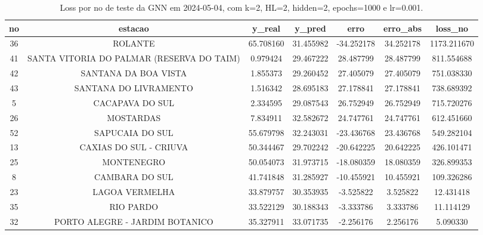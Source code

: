 \begin{table}[h]
\centering
\caption{Loss por no de teste da GNN em 2024-05-04, com k=2, HL=2, hidden=2, epochs=1000 e lr=0.001.}
\label{tab:gnn_loss_k2_hl2_h2_e1000_d20240504}
\begin{tabular}{ccccccc}
\toprule
no & estacao & y\_real & y\_pred & erro & erro\_abs & loss\_no \\
\midrule
36 & ROLANTE & 65.708160 & 31.455982 & -34.252178 & 34.252178 & 1173.211670 \\
41 & SANTA VITORIA DO PALMAR (RESERVA DO TAIM) & 0.979424 & 29.467222 & 28.487799 & 28.487799 & 811.554688 \\
42 & SANTANA DA BOA VISTA & 1.855373 & 29.260452 & 27.405079 & 27.405079 & 751.038330 \\
43 & SANTANA DO LIVRAMENTO & 1.516342 & 28.695183 & 27.178841 & 27.178841 & 738.689392 \\
5 & CACAPAVA DO SUL & 2.334595 & 29.087543 & 26.752949 & 26.752949 & 715.720276 \\
26 & MOSTARDAS & 7.834911 & 32.582672 & 24.747761 & 24.747761 & 612.451660 \\
52 & SAPUCAIA DO SUL & 55.679798 & 32.243031 & -23.436768 & 23.436768 & 549.282104 \\
13 & CAXIAS DO SUL - CRIUVA & 50.344467 & 29.702242 & -20.642225 & 20.642225 & 426.101471 \\
25 & MONTENEGRO & 50.054073 & 31.973715 & -18.080359 & 18.080359 & 326.899353 \\
8 & CAMBARA DO SUL & 41.741848 & 31.285927 & -10.455921 & 10.455921 & 109.326286 \\
23 & LAGOA VERMELHA & 33.879757 & 30.353935 & -3.525822 & 3.525822 & 12.431418 \\
35 & RIO PARDO & 33.522129 & 30.188343 & -3.333786 & 3.333786 & 11.114129 \\
32 & PORTO ALEGRE - JARDIM BOTANICO & 35.327911 & 33.071735 & -2.256176 & 2.256176 & 5.090330 \\
\bottomrule
\end{tabular}
\end{table}
